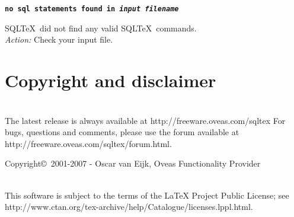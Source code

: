 \documentclass{article}
\begin{document}
\noindent\textbf{\texttt{no sql statements found in \textit{input filename}}}

\vspace{1mm}

\noindent SQL\TeX\ did not find any valid SQL\TeX\ commands. \\
\textit{Action:} Check your input file.

\section{Copyright and disclaimer}

\noindent\hrulefill \\
The latest release is always available at http://freeware.oveas.com/sqltex
For bugs, questions and comments, please use the forum available at\\
http://freeware.oveas.com/sqltex/forum.html.

\vspace{3mm}

\noindent Copyright\copyright\ 2001-2007 - Oscar van Eijk, Oveas Functionality Provider

\noindent\hrulefill \\


\noindent This software is subject to the terms of the LaTeX Project Public License; 
see http://www.ctan.org/tex-archive/help/Catalogue/licenses.lppl.html.
\end{document}
